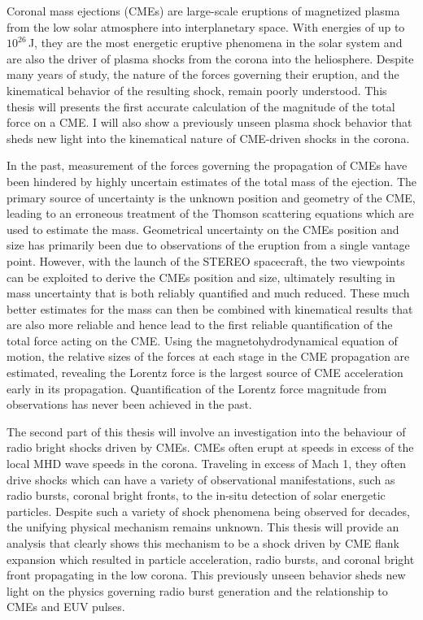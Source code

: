 
\begin{abstracts} 

Coronal mass ejections (CMEs) are large-scale eruptions of magnetized plasma from the low solar atmosphere into interplanetary space. With energies of up to $10^{26}$\,J, they are the most energetic eruptive phenomena in the solar system and are also the driver of plasma shocks from the corona into the heliosphere. Despite many years of study, the nature of the forces governing their eruption, and the kinematical behavior of the resulting shock, remain poorly understood. This thesis will presents the first accurate calculation of the magnitude of the total force on a CME. I will also show a previously unseen plasma shock behavior that sheds new light into the kinematical nature of CME-driven shocks in the corona.

In the past, measurement of the forces governing the propagation of CMEs have been hindered by highly uncertain estimates of the total mass of the ejection. The primary source of uncertainty is the unknown position and geometry of the CME, leading to an erroneous treatment of the Thomson scattering equations which are used to estimate the mass. Geometrical uncertainty on the CMEs position and size has primarily been due to observations of the eruption from a single vantage point. However, with the launch of the STEREO spacecraft, the two viewpoints can be exploited to derive the CMEs position and size, ultimately resulting in mass uncertainty that is both reliably quantified and much reduced. These much better estimates for the mass can then be combined with kinematical results that are also more reliable and hence lead to the first reliable quantification of the total force acting on the CME. 
Using the magnetohydrodynamical equation of motion, the relative sizes of the forces at each stage in the CME propagation are estimated, revealing the Lorentz force is the largest source of CME acceleration early in its propagation. Quantification of the Lorentz force magnitude from observations has never been achieved in the past.

The second part of this thesis will involve an investigation into the behaviour of radio bright shocks driven by CMEs. CMEs often erupt at speeds in excess of the local MHD wave speeds in the corona. Traveling in excess of Mach 1, they often drive shocks which can have a variety of observational manifestations, such as radio bursts, coronal bright fronts, to the in-situ detection of solar energetic particles. Despite such a variety of shock phenomena being observed for decades, the unifying physical mechanism remains unknown. This thesis will provide an analysis that clearly shows this mechanism to be a shock driven by CME flank expansion which resulted in particle acceleration, radio bursts, and coronal bright front propagating in the low corona. This previously unseen behavior sheds new light on the physics governing radio burst generation and the relationship to CMEs and EUV pulses.

\end{abstracts}

